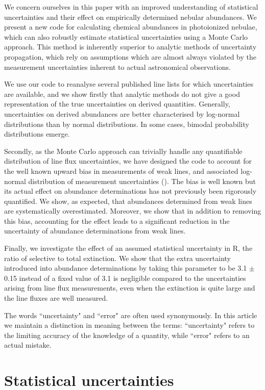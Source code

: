 \documentclass[useAMS,usenatbib]{mn2e}
\begin{document}
We concern ourselves in this paper with an improved understanding of statistical uncertainties and their effect on empirically determined nebular abundances.  We present a new code for calculating chemical abundances in photoionized nebulae, which can also robustly estimate statistical uncertainties using a Monte Carlo approach.  This method is inherently superior to analytic methods of uncertainty propagation, which rely on assumptions which are almost always violated by the measurement uncertainties inherent to actual astronomical observations.

We use our code to reanalyse several published line lists for which uncertainties are available, and we show firstly that analytic methods do not give a good representation of the true uncertainties on derived quantities.  Generally, uncertainties on derived abundances are better characterised by log-normal distributions than by normal distributions.  In some cases, bimodal probability distributions emerge.

Secondly, as the Monte Carlo approach can trivially handle any quantifiable distribution of line flux uncertainties, we have designed the code to account for the well known upward bias in measurements of weak lines, and associated log-normal distribution of measurement uncertainties (\citealt{1994A&A...287..676R}).  The bias is well known but its actual effect on abundance determinations has not previously been rigorously quantified.  We show, as expected, that abundances determined from weak lines are systematically overestimated.  Moreover, we show that in addition to removing this bias, accounting for the effect leads to a significant reduction in the uncertainty of abundance determinations from weak lines.

Finally, we investigate the effect of an assumed statistical uncertainty in R, the ratio of selective to total extinction.  We show that the extra uncertainty introduced into abundance determinations by taking this parameter to be 3.1 $\pm$ 0.15 instead of a fixed value of 3.1 is negligible compared to the uncertainties arising from line flux measurements, even when the extinction is quite large and the line fluxes are well measured.

The words ``uncertainty" and ``error" are often used synonymously.  In this article we maintain a distinction in meaning between the terms: ``uncertainty" refers to the limiting accuracy of the knowledge of a quantity, while ``error" refers to an actual mistake.

\section{Statistical uncertainties}
\end{document}
